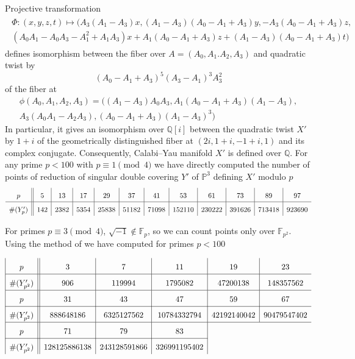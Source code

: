 \documentclass[12pt]{amsart}
\theoremstyle{plain}
\theoremstyle{remark}
\theoremstyle{definition}
\newcommand\QQ{{\mathbb Q}}
\numberwithin{table}{section}
\begin{document}
Projective transformation
\begin{multline*}
\begin{array}{c}
\Phi:\left(	x,y,z,t\right)\longmapsto
\biggl( A_{3}(A_{1}-A_{3})x, (A_{1} - A_{3}) (A_{0} - A_{1} + A_{3}) y, - A_{3} (A_{0} - A_{1} + A_{3}) z,\\
(A_{0} A_{1} - A_{0} A_{3} - A_{1}^{2}  + A_{1} A_{3}) x + A_{1} (A_{0} - A_{1} + A_{3}) z + (A_{1} - A_{3}) (A_{0} - A_{1} + A_{3}) t
\biggr)
\end{array}
\end{multline*}
defines isomorphism between the fiber over $A=(A_{0},A_{1}.A_{2},A_{3})$ and quadratic twist by
\[
(A_{0} - A_{1} + A_{3})^{5}  (A_{3} - A_{1})^{3}  A_{3}^{2}
\]
of the fiber at
\begin{multline*}
	\phi(A_{0},A_{1},A_{2},A_{3}) =
	\biggl((A_{1} - A_{3}) A_{0} A_{3}, A_{1} (A_{0} - A_{1} + A_{3}) (A_{1} - A_{3}),\\ A_{3} (A_{0} A_{1} - A_{2} A_{3}),  (A_{0} - A_{1} + A_{3}) (A_{1} - A_{3})^{3}\biggr)
\end{multline*}
In particular, it gives an isomorphism over $\QQ[i]$ between the quadratic twist $X'$ by $1+i$ of the geometrically distinguished fiber at $(2i,1+i,-1+i,1)$ and its complex conjugate. Consequently, Calabi--Yau manifold $X'$ is defined over $\mathbb Q$.
For any prime $p<100$ with $p\equiv 1\pmod4$ we have directly computed the number of points of reduction of singular double covering $Y'$ of $\mathbb P^{3}$ defining $X'$ modulo $p$
\[
\begin{array}{c|*{11}{|c}}
	p&5&13&17&29&37&41&53&61&73&89&97\rule[-2mm]{0mm}{7mm}\\\hline
	\#(Y'_{p})&142&2382&5354&25838&51182& 71098&152110&230222& 391626& 713418& 923690\rule[-2mm]{0mm}{7mm}
\end{array}
\]

For primes $p\equiv 3\pmod 4$, $\sqrt{-1}\not\in\mathbb F_{p}$, so we can count points only over $\mathbb F_{p^{2}}$. Using the method of \cite{czarnecki} we have computed for primes $p<100$

\[
\begin{array}{|c|*{5}{|c}}\rule[-2mm]{0mm}{7mm}
	p&3&7&11&19&23\\\hline\rule[-2mm]{0mm}{7mm}
	\#(Y'_{p^{2}})&906&119994&1795082&47200138&148357562 \\\hline\rule[-2mm]{0mm}{7mm}
	 p&31&43&47&59&67\\\cline{1-6}\rule[-2mm]{0mm}{7mm}
	 \#(Y'_{p^{2}})&888648186&6325127562&10784332794&42192140042&90479547402\\\hline\rule[-2mm]{0mm}{7mm}
	 p&71&79&\multicolumn{1}{c|}{83}\\\cline{1-4}\rule[-2mm]{0mm}{7mm}
	 \#(Y'_{p^{2}})&128125886138&243128591866&\multicolumn{1}{c|}{326991195402}
\end{array}
\]
\end{document}
